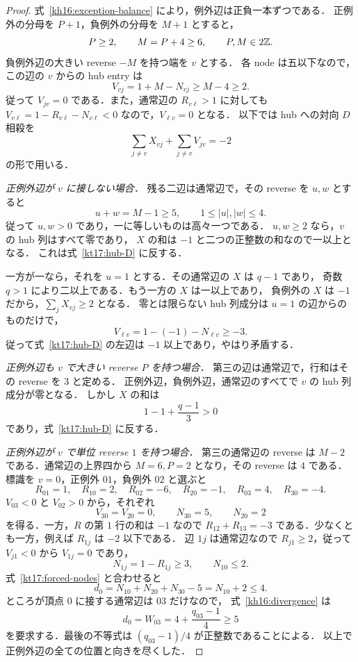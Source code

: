 \begin{proof}
式~\eqref{kh16:exception-balance} により，例外辺は正負一本ずつである．
正例外の分母を $P+1$，負例外の分母を $M+1$ とすると，
\[
 P\ge2,\qquad M=P+4\ge6,
 \qquad P,M\in2\mathbb Z.
\]
負例外辺の大きい reverse $-M$ を持つ端を $v$ とする．
各 node は五以下なので，この辺の $v$ からの hub entry は
\[
 V_{vj}=1+M-N_{vj}\ge M-4\ge2.
\]
従って $V_{jv}=0$ である．また，通常辺の $R_{v\ell}>1$ に対しても
$V_{v\ell}=1-R_{v\ell}-N_{v\ell}<0$ なので，$V_{\ell v}=0$ となる．
以下では hub への対向 $D$ 相殺を
\begin{equation}\label{kt17:hub-D}
 \sum_{j\ne v}X_{vj}+\sum_{j\ne v}V_{jv}=-2
\end{equation}
の形で用いる．

\emph{正例外辺が $v$ に接しない場合．}
残る二辺は通常辺で，その reverse を $u,w$ とすると
\[
 u+w=M-1\ge5,\qquad 1\le |u|,|w|\le4.
\]
従って $u,w>0$ であり，一に等しいものは高々一つである．
$u,w\ge2$ なら，$v$ の hub 列はすべて零であり，
$X$ の和は $-1$ と二つの正整数の和なので一以上となる．
これは式~\eqref{kt17:hub-D} に反する．

一方が一なら，それを $u=1$ とする．その通常辺の $X$ は $q-1$ であり，
奇数 $q>1$ により二以上である．もう一方の $X$ は一以上であり，
負例外の $X$ は $-1$ だから，$\sum_jX_{vj}\ge2$ となる．
零とは限らない hub 列成分は $u=1$ の辺からのものだけで，
\[
 V_{\ell v}=1-(-1)-N_{\ell v}\ge-3.
\]
従って式~\eqref{kt17:hub-D} の左辺は $-1$ 以上であり，やはり矛盾する．

\emph{正例外辺も $v$ で大きい reverse $P$ を持つ場合．}
第三の辺は通常辺で，行和はその reverse を $3$ と定める．
正例外辺，負例外辺，通常辺のすべてで $v$ の hub 列成分が零となる．
しかし $X$ の和は
\[
 1-1+\frac{q-1}{3}>0
\]
であり，式~\eqref{kt17:hub-D} に反する．

\emph{正例外辺が $v$ で単位 reverse $1$ を持つ場合．}
第三の通常辺の reverse は $M-2$ である．通常辺の上界四から
$M=6,P=2$ となり，その reverse は $4$ である．
標識を $v=0$，正例外 $01$，負例外 $02$ と選ぶと
\[
 R_{01}=1,\quad R_{10}=2,\quad
 R_{02}=-6,\quad R_{20}=-1,\quad
 R_{03}=4,\quad R_{30}=-4.
\]
$V_{03}<0$ と $V_{02}>0$ から，それぞれ
\begin{equation}\label{kt17:forced-nodes}
 V_{30}=V_{20}=0,\qquad N_{30}=5,\qquad N_{20}=2
\end{equation}
を得る．一方，$R$ の第 $1$ 行の和は $-1$ なので
$R_{12}+R_{13}=-3$ である．少なくとも一方，例えば $R_{1j}$ は $-2$ 以下である．
辺 $1j$ は通常辺なので $R_{j1}\ge2$，従って $V_{j1}<0$ から $V_{1j}=0$ であり，
\[
 N_{1j}=1-R_{1j}\ge3,\qquad N_{10}\le2.
\]
式~\eqref{kt17:forced-nodes} と合わせると
\[
 d_0=N_{10}+N_{20}+N_{30}-5=N_{10}+2\le4.
\]
ところが頂点 $0$ に接する通常辺は $03$ だけなので，
式~\eqref{kh16:divergence} は
\[
 d_0=W_{03}=4+\frac{q_{03}-1}{4}\ge5
\]
を要求する．最後の不等式は $(q_{03}-1)/4$ が正整数であることによる．
以上で正例外辺の全ての位置と向きを尽くした．
\end{proof}

